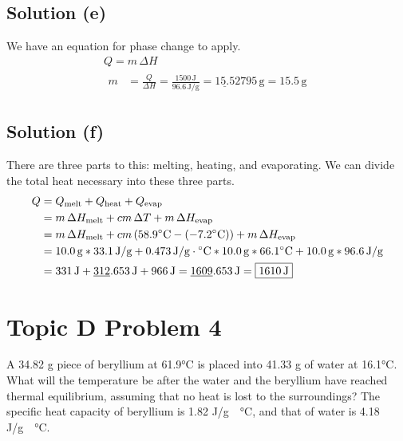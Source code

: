 \documentclass[10pt]{article}
\newcommand{\U}[1]{\underline{#1}}
\begin{document}
        \subsection{Solution (e)}
            We have an equation for phase change to apply.
            \begin{gather}
                Q   =   m\,\Delta H\\
                \begin{align}
                    m   &=  \frac{Q}{\Delta H}
                        =   \frac{1500\,\unit{\joule}}{96.6\,\unit{\joule/\gram}}
                        =   \U{15.5}2795\,\unit{\gram}
                        =   \boxed{15.5\,\unit{\gram}}
                \end{align}
            \end{gather}

        \subsection{Solution (f)}
            There are three parts to this: melting, heating, and evaporating.
            We can divide the total heat necessary into these three parts.
            \begin{align}
                Q   &=  Q_{\rm melt} + Q_{\rm heat} + Q_{\rm evap}\\
                    &=  m\,\Delta H_{\rm melt} + cm\,\Delta T + m\,\Delta H_{\rm evap}\\
                    &=  m\,\Delta H_{\rm melt} + cm\,(58.9\unit{\celsius} - (-7.2\unit{\celsius})) + m\,\Delta H_{\rm evap}\\
                    &=  10.0\,\unit{\gram} * 33.1\,\unit{\joule/\gram}
                        +   0.473\,\unit{\joule/\gram\cdot\celsius} * 10.0\,\unit{\gram} * 66.1\unit{\celsius}
                        +   10.0\,\unit{\gram} * 96.6\,\unit{\joule/\gram}\\
                    &=  331\,\unit{\joule} + \U{312}.653\,\unit{\joule} + 966\,\unit{\joule}
                    =   \U{1609}.653\,\unit{\joule}
                    =   \boxed{1610\,\unit{\joule}}
            \end{align}

    \pagebreak
    \section{Topic D Problem 4}
        A 34.82 g piece of beryllium at 61.9\unit{\celsius} is placed into 41.33 g of water at 16.1\unit{\celsius}. 
        What will the temperature be after the water and the beryllium have reached thermal equilibrium, assuming that no heat is lost to the surroundings? 
        The specific heat capacity of beryllium is 1.82 \unit{\joule/\gram\cdot\celsius}, and that of water is 4.18 \unit{\joule/\gram\cdot\celsius}.
\end{document}
